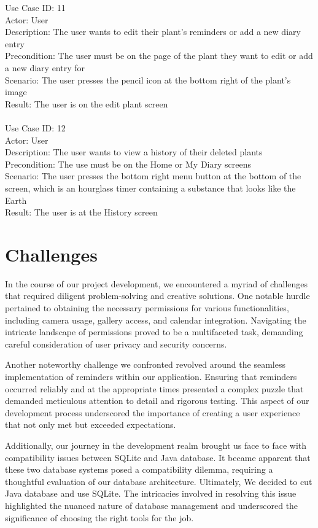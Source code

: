 \documentclass{sigchi}
\begin{document}
Use Case ID: 11 \\
Actor: User \\
Description: The user wants to edit their plant's reminders or add a new diary entry \\
Precondition: The user must be on the page of the plant they want to edit or add a new diary entry for \\
Scenario: The user presses the pencil icon at the bottom right of the plant's image \\
Result: The user is on the edit plant screen \\
\\

Use Case ID: 12 \\
Actor: User \\
Description: The user wants to view a history of their deleted plants \\
Precondition: The use must be on the Home or My Diary screens \\
Scenario: The user presses the bottom right menu button at the bottom of the screen, which is an hourglass timer containing a substance that looks like the Earth \\
Result: The user is at the History screen \\

\section{Challenges}
In the course of our project development, we encountered a myriad of challenges that required diligent problem-solving and creative solutions. One notable hurdle pertained to obtaining the necessary permissions for various functionalities, including camera usage, gallery access, and calendar integration. Navigating the intricate landscape of permissions proved to be a multifaceted task, demanding careful consideration of user privacy and security concerns.

Another noteworthy challenge we confronted revolved around the seamless implementation of reminders within our application. Ensuring that reminders occurred reliably and at the appropriate times presented a complex puzzle that demanded meticulous attention to detail and rigorous testing. This aspect of our development process underscored the importance of creating a user experience that not only met but exceeded expectations.

Additionally, our journey in the development realm brought us face to face with compatibility issues between SQLite and Java database. It became apparent that these two database systems posed a compatibility dilemma, requiring a thoughtful evaluation of our database architecture. Ultimately, We decided to cut Java database and use SQLite. The intricacies involved in resolving this issue highlighted the nuanced nature of database management and underscored the significance of choosing the right tools for the job.
\end{document}
